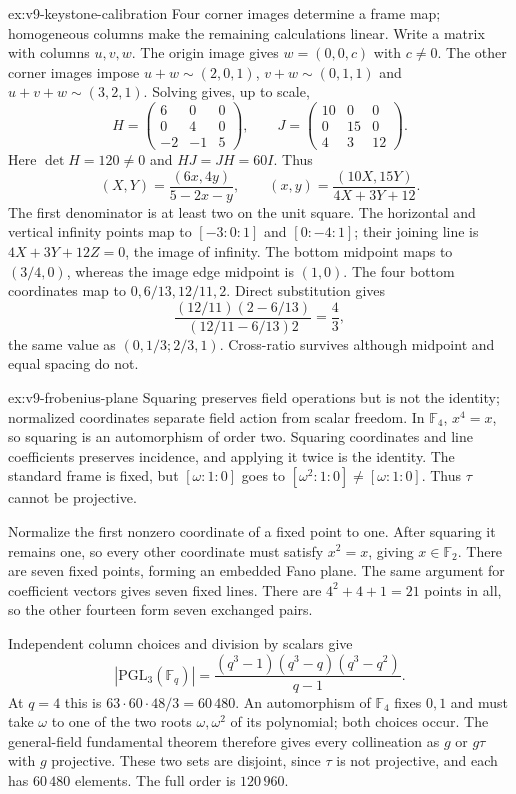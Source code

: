 \begin{solution}{ex:v9-keystone-calibration}
\idea Four corner images determine a frame map; homogeneous columns make the remaining calculations linear.
\writeup Write a matrix with columns $u,v,w$. The origin image gives $w=(0,0,c)$ with $c\ne0$. The other corner images impose $u+w\sim(2,0,1)$, $v+w\sim(0,1,1)$ and $u+v+w\sim(3,2,1)$. Solving gives, up to scale,
\[
H=\begin{pmatrix}6&0&0\\0&4&0\\-2&-1&5\end{pmatrix},\qquad
J=\begin{pmatrix}10&0&0\\0&15&0\\4&3&12\end{pmatrix}.
\]
Here $\det H=120\ne0$ and $HJ=JH=60I$. Thus
\[
(X,Y)=\frac{(6x,4y)}{5-2x-y},\qquad
(x,y)=\frac{(10X,15Y)}{4X+3Y+12}.
\]
The first denominator is at least two on the unit square. The horizontal and vertical infinity points map to $[-3:0:1]$ and $[0:-4:1]$; their joining line is $4X+3Y+12Z=0$, the image of infinity. The bottom midpoint maps to $(3/4,0)$, whereas the image edge midpoint is $(1,0)$. The four bottom coordinates map to $0,6/13,12/11,2$. Direct substitution gives
\[
\frac{(12/11)(2-6/13)}{(12/11-6/13)2}=\frac43,
\]
the same value as $(0,1/3;2/3,1)$. Cross-ratio survives although midpoint and equal spacing do not.
\end{solution}
\begin{solution}{ex:v9-frobenius-plane}
\idea Squaring preserves field operations but is not the identity; normalized coordinates separate field action from scalar freedom.
\writeup In $\mathbb F_4$, $x^4=x$, so squaring is an automorphism of order two. Squaring coordinates and line coefficients preserves incidence, and applying it twice is the identity. The standard frame is fixed, but $[\omega:1:0]$ goes to $[\omega^2:1:0]\ne[\omega:1:0]$. Thus $\tau$ cannot be projective.

Normalize the first nonzero coordinate of a fixed point to one. After squaring it remains one, so every other coordinate must satisfy $x^2=x$, giving $x\in\mathbb F_2$. There are seven fixed points, forming an embedded Fano plane. The same argument for coefficient vectors gives seven fixed lines. There are $4^2+4+1=21$ points in all, so the other fourteen form seven exchanged pairs.

Independent column choices and division by scalars give
\[
|\mathrm{PGL}_3(\mathbb F_q)|
=\frac{(q^3-1)(q^3-q)(q^3-q^2)}{q-1}.
\]
At $q=4$ this is $63\cdot60\cdot48/3=60\,480$. An automorphism of $\mathbb F_4$ fixes $0,1$ and must take $\omega$ to one of the two roots $\omega,\omega^2$ of its polynomial; both choices occur. The general-field fundamental theorem therefore gives every collineation as $g$ or $g\tau$ with $g$ projective. These two sets are disjoint, since $\tau$ is not projective, and each has $60\,480$ elements. The full order is $120\,960$.
\end{solution}
